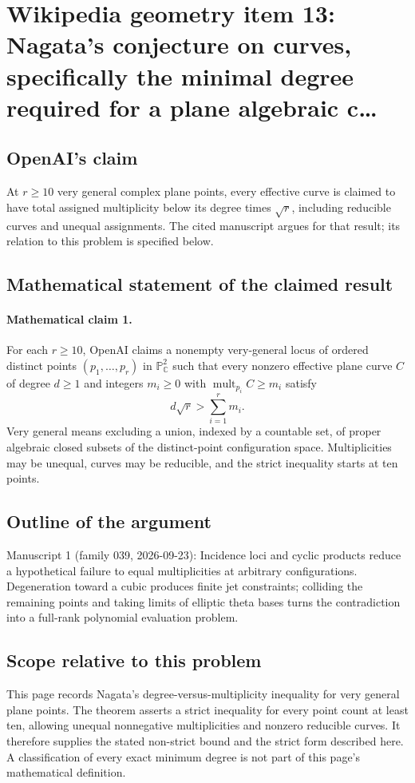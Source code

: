\documentclass[11pt]{article}
\begin{document}
\section*{Wikipedia geometry item 13: Nagata's conjecture on curves, specifically the minimal degree required for a plane algebraic c…}

\subsection{OpenAI's claim}
At $r\ge10$ very general complex plane points, every effective curve is claimed to have total assigned multiplicity below its degree times $\sqrt r$, including reducible curves and unequal assignments. The cited manuscript argues for that result; its relation to this problem is specified below.

\subsection{Mathematical statement of the claimed result}
\paragraph{Mathematical claim 1.} For each $r\ge10$, OpenAI claims a nonempty very-general locus of ordered distinct points $(p_1,\ldots,p_r)$ in $\mathbb P^2_{\mathbb C}$ such that every nonzero effective plane curve $C$ of degree $d\ge1$ and integers $m_i\ge0$ with $\operatorname{mult}_{p_i}C\ge m_i$ satisfy
\[
d\sqrt r>\sum_{i=1}^r m_i.
\]
Very general means excluding a union, indexed by a countable set, of proper algebraic closed subsets of the distinct-point configuration space. Multiplicities may be unequal, curves may be reducible, and the strict inequality starts at ten points.

\subsection{Outline of the argument}
Manuscript 1 (family 039, 2026-09-23): Incidence loci and cyclic products reduce a hypothetical failure to equal multiplicities at arbitrary configurations. Degeneration toward a cubic produces finite jet constraints; colliding the remaining points and taking limits of elliptic theta bases turns the contradiction into a full-rank polynomial evaluation problem.

\subsection{Scope relative to this problem}
This page records Nagata's degree-versus-multiplicity inequality for very general plane points. The theorem asserts a strict inequality for every point count at least ten, allowing unequal nonnegative multiplicities and nonzero reducible curves. It therefore supplies the stated non-strict bound and the strict form described here. A classification of every exact minimum degree is not part of this page's mathematical definition.
\end{document}
